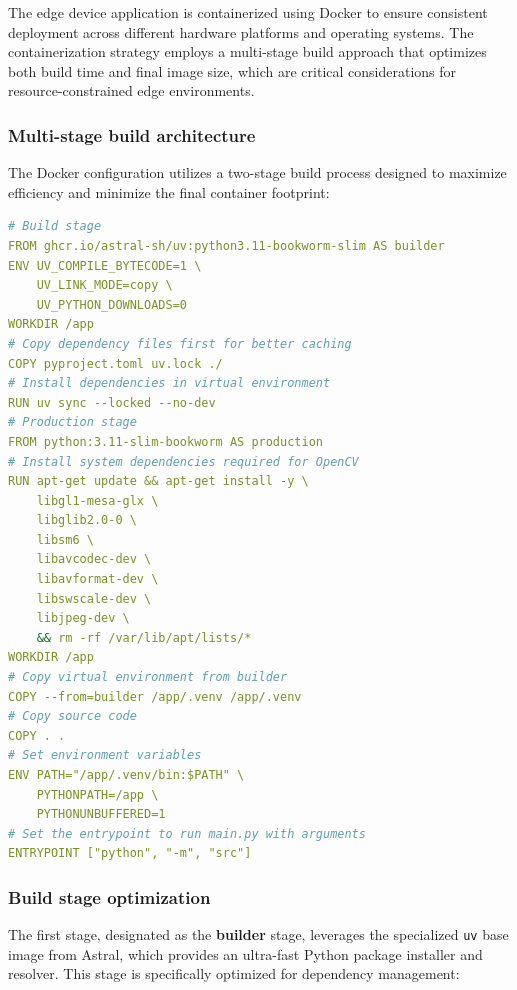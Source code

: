 The edge device application is containerized using Docker to ensure consistent deployment across different hardware platforms and operating systems. The containerization strategy employs a multi-stage build approach that optimizes both build time and final image size, which are critical considerations for resource-constrained edge environments.

\subsubsection{Multi-stage build architecture}

The Docker configuration utilizes a two-stage build process designed to maximize efficiency and minimize the final container footprint:

\begin{lstlisting}[language=yaml, caption={Multi-stage Docker build configuration for edge deployment}]
# Build stage
FROM ghcr.io/astral-sh/uv:python3.11-bookworm-slim AS builder
ENV UV_COMPILE_BYTECODE=1 \
    UV_LINK_MODE=copy \
    UV_PYTHON_DOWNLOADS=0
WORKDIR /app
# Copy dependency files first for better caching
COPY pyproject.toml uv.lock ./
# Install dependencies in virtual environment
RUN uv sync --locked --no-dev
# Production stage
FROM python:3.11-slim-bookworm AS production
# Install system dependencies required for OpenCV
RUN apt-get update && apt-get install -y \
    libgl1-mesa-glx \
    libglib2.0-0 \
    libsm6 \
    libavcodec-dev \
    libavformat-dev \
    libswscale-dev \
    libjpeg-dev \
    && rm -rf /var/lib/apt/lists/*
WORKDIR /app
# Copy virtual environment from builder
COPY --from=builder /app/.venv /app/.venv
# Copy source code
COPY . .
# Set environment variables
ENV PATH="/app/.venv/bin:$PATH" \
    PYTHONPATH=/app \
    PYTHONUNBUFFERED=1
# Set the entrypoint to run main.py with arguments
ENTRYPOINT ["python", "-m", "src"]
\end{lstlisting}

\subsubsection{Build stage optimization}

The first stage, designated as the \textbf{builder} stage, leverages the specialized \texttt{uv} base image from Astral, which provides an ultra-fast Python package installer and resolver. This stage is specifically optimized for dependency management:

